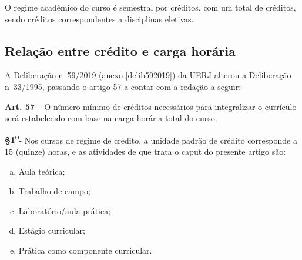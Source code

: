 O regime acadêmico do curso é semestral por créditos, com um total de \tCredCurso créditos, sendo \credEletivas créditos correspondentes a disciplinas eletivas.

\subsection{Relação entre crédito e carga horária}
A Deliberação n\textordmasculine~59/2019 (anexo \ref{delib592019}) da UERJ alterou a Deliberação n\textordmasculine~33/1995, passando o artigo 57 a contar com a redação a seguir:

\begin{itquotation}
  \textbf{Art. 57} -- O número mínimo de créditos necessários para integralizar o currículo será estabelecido com base na carga horária total do curso.

  \textbf{\S 1\textsuperscript{o}}- Nos cursos de regime de crédito, a unidade padrão de crédito
  corresponde a 15 (quinze) horas, e as atividades de que trata o caput do
  presente artigo são:
  \begin{enumerate}[a)]
    \item Aula teórica;
    \item Trabalho de campo;
    \item Laboratório/aula prática;
    \item Estágio curricular;
    \item Prática como componente curricular.
  \end{enumerate}
\end{itquotation}
